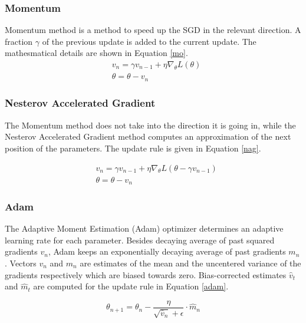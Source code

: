     \subsubsection{Momentum}
    Momentum method is a method to speed up the SGD in the relevant direction.  A fraction $\gamma$ of the previous update is added to the current update. The mathesmatical details are shown in Equation \ref{mo}.
    \begin{equation}
        \begin{aligned}
            & v_n = \gamma v_{n-1} + \eta \nabla_{\theta}L(\theta) \\
            & \theta= \theta - v_{n}
        \end{aligned}
        \label{mo}
    \end{equation} 

    \subsubsection{Nesterov Accelerated Gradient}
    The Momentum method does not take into the direction it is going in, while the Nesterov Accelerated Gradient method computes an approximation of the next position of the parameters. The update rule is given in Equation \ref{nag}.

    \begin{equation}
        \begin{aligned}
            & v_n = \gamma v_{n-1} + \eta \nabla_{\theta}L(\theta - \gamma v_{n-1}) \\
            & \theta= \theta - v_{n}
        \end{aligned}
        \label{nag}
    \end{equation}

    \subsubsection{Adam}
    The Adaptive Moment Estimation (Adam) optimizer \cite{DBLP:journals/corr/KingmaB14} determines an adaptive learning rate for each parameter. Besides decaying average of past squared gradients $v_n$, Adam keeps an exponentially decaying average of past gradients $m_n$. Vectors $v_n$ and $m_n$ are estimates of the mean and the uncentered variance of the gradients respectively which are biased towards zero. Bias-corrected estimates $\hat{v}_t$ and $\hat{m}_t$ are computed for the update rule in Equation \ref{adam}.

    \begin{equation}
        \theta_{n+1} = \theta_{n} - \frac{\eta}{\sqrt{\hat{v}_n} + \epsilon}\cdot \hat{m}_n
    \end{equation}

